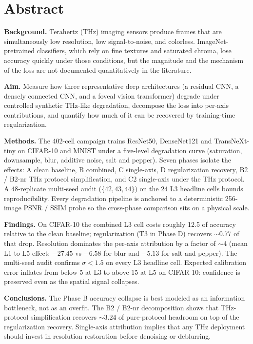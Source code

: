 \section*{Abstract}

\noindent\textbf{Background.}\quad
Terahertz (THz) imaging sensors produce frames that are simultaneously low
resolution, low signal-to-noise, and colorless. ImageNet-pretrained classifiers,
which rely on fine textures and saturated chroma, lose accuracy quickly under
those conditions, but the magnitude and the mechanism of the loss are not
documented quantitatively in the literature.

\noindent\textbf{Aim.}\quad
Measure how three representative deep architectures (a residual CNN, a densely
connected CNN, and a foveal vision transformer) degrade under controlled
synthetic THz-like degradation, decompose the loss into per-axis contributions,
and quantify how much of it can be recovered by training-time regularization.

\noindent\textbf{Methods.}\quad
The 402-cell campaign trains ResNet50, DenseNet121 and TransNeXt-tiny on
CIFAR-10 and MNIST under a five-level degradation curve (saturation,
downsample, blur, additive noise, salt and pepper). Seven phases isolate the
effects: A clean baseline, B combined, C single-axis, D regularization
recovery, B2 / B2-nr THz protocol simplification, and C2 single-axis under the
THz protocol. A 48-replicate multi-seed audit ($\{42, 43, 44\}$) on the 24 L3
headline cells bounds reproducibility. Every degradation pipeline is anchored
to a deterministic 256-image PSNR / SSIM probe so the cross-phase comparison
sits on a physical scale.

\noindent\textbf{Findings.}\quad
On CIFAR-10 the combined L3 cell costs roughly 12.5 \Mpp{} of accuracy
relative to the clean baseline; regularization (T3 in Phase D) recovers
$\sim$0.77 \Mpp{} of that drop. Resolution dominates the per-axis attribution
by a factor of $\sim$4 (mean L1 to L5 effect: $-27.45$ \Mpp{} vs $-6.58$ for
blur and $-5.13$ for salt and pepper). The multi-seed audit confirms
$\sigma < 1.5$ \Mpp{} on every L3 headline cell. Expected calibration error
inflates from below 5 \Mpp{} at L3 to above 15 \Mpp{} at L5 on CIFAR-10:
confidence is preserved even as the spatial signal collapses.

\noindent\textbf{Conclusions.}\quad
The Phase B accuracy collapse is best modeled as an information bottleneck,
not as an overfit. The B2 / B2-nr decomposition shows that THz-protocol
simplification recovers $\sim$3.24 \Mpp{} of pure-protocol headroom on top of
the regularization recovery. Single-axis attribution implies that any THz
deployment should invest in resolution restoration before denoising or
deblurring.

